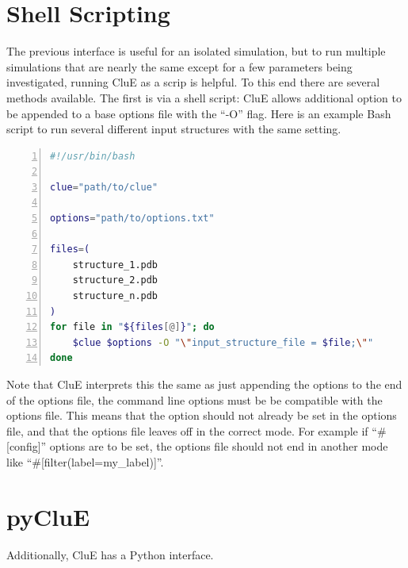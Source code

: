 \documentclass{book}
\begin{document}
\section{Shell Scripting}
The previous interface is useful for an isolated simulation, 
but to run multiple simulations that are nearly the same except for a few
parameters being investigated, running CluE as a scrip is helpful.  
To this end there are several methods available.
The first is via a shell script: CluE allows additional option to be appended
to a base options file with the ``-O'' flag.  
Here is an example  Bash script to run several different input structures
with the same setting.
\begin{lstlisting}[frame=single,numbers=left,language=bash]
#!/usr/bin/bash

clue="path/to/clue"

options="path/to/options.txt"

files=( 
    structure_1.pdb
    structure_2.pdb
    structure_n.pdb
)
for file in "${files[@]}"; do
    $clue $options -O "\"input_structure_file = $file;\""
done
\end{lstlisting}
Note that CluE interprets this the same as just appending 
the options to the end of the options file,
the command line options must be be compatible with the options file.
This means that the option should not already be set in the options file,
and that the options file leaves off in the correct mode.
For example if ``\#[config]'' options are to be set, the options file should
not end in another mode like ``\#[filter(label=my\_label)]''.

\section{pyCluE}
Additionally, CluE has a Python interface.
\end{document}
